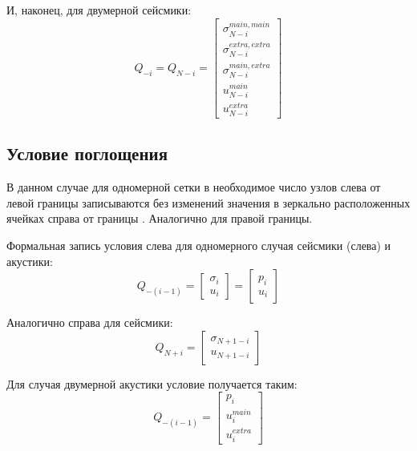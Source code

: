 \documentclass{article}
\begin{document}
\indent
И, наконец, для двумерной сейсмики:
$$Q_{-i} = Q_{N-i} = \left[ \begin{array}{c}
                            \sigma^{main, main}_{N-i} \\
                            \sigma^{extra, extra}_{N-i} \\
                            \sigma^{main, extra}_{N-i} \\
                            u^{main}_{N-i} \\
                            u^{extra}_{N-i}
                            \end{array}    \right] $$

\subsection{Условие поглощения}

\indent
В данном случае для одномерной сетки в необходимое число узлов слева от левой границы записываются без изменений значения в зеркально расположенных ячейках справа от границы \cite[глава 7.3.1]{finite}. Аналогично для правой границы.

\indent
Формальная запись условия слева для одномерного случая сейсмики (слева) и акустики:
$$Q_{-(i-1)} = \left[ \begin{array}{c}
                      \sigma_i \\
                      u_i
                      \end{array}    \right] =
               \left[ \begin{array}{c}
                      p_i \\
                      u_i
                      \end{array}    \right] $$

\indent
Аналогично справа для сейсмики:
$$Q_{N+i} = \left[ \begin{array}{c}
                   \sigma_{N+1-i} \\
                   u_{N+1-i}
                   \end{array}    \right] $$

\indent
Для случая двумерной акустики условие получается таким:
$$Q_{-(i-1)} = \left[ \begin{array}{c}
                      p_i \\
                      u^{main}_i \\
                      u^{extra}_i 
                      \end{array}    \right] $$
\end{document}
